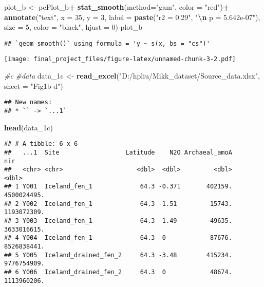 \documentclass[
]{article}
\newenvironment{Shaded}{\begin{snugshade}}{\end{snugshade}}
\newcommand{\AttributeTok}[1]{\textcolor[rgb]{0.13,0.29,0.53}{#1}}
\newcommand{\CommentTok}[1]{\textcolor[rgb]{0.56,0.35,0.01}{\textit{#1}}}
\newcommand{\DecValTok}[1]{\textcolor[rgb]{0.00,0.00,0.81}{#1}}
\newcommand{\FunctionTok}[1]{\textcolor[rgb]{0.13,0.29,0.53}{\textbf{#1}}}
\newcommand{\NormalTok}[1]{#1}
\newcommand{\OtherTok}[1]{\textcolor[rgb]{0.56,0.35,0.01}{#1}}
\newcommand{\SpecialCharTok}[1]{\textcolor[rgb]{0.81,0.36,0.00}{\textbf{#1}}}
\newcommand{\StringTok}[1]{\textcolor[rgb]{0.31,0.60,0.02}{#1}}
\begin{document}
\begin{Shaded}
\begin{Highlighting}[]
\NormalTok{plot\_b }\OtherTok{\textless{}{-}}\NormalTok{ pcPlot\_b}\SpecialCharTok{+}
  \FunctionTok{stat\_smooth}\NormalTok{(}\AttributeTok{method=}\StringTok{"gam"}\NormalTok{, }\AttributeTok{color =} \StringTok{"red"}\NormalTok{)}\SpecialCharTok{+}
  \FunctionTok{annotate}\NormalTok{(}\StringTok{"text"}\NormalTok{, }
           \AttributeTok{x =} \DecValTok{35}\NormalTok{, }\AttributeTok{y =} \DecValTok{3}\NormalTok{,}
           \AttributeTok{label =} \FunctionTok{paste}\NormalTok{(}\StringTok{"r2 = 0.29"}\NormalTok{, }\StringTok{"}\SpecialCharTok{\textbackslash{}n}\StringTok{ p = 5.642e{-}07"}\NormalTok{), }
           \AttributeTok{size =} \DecValTok{5}\NormalTok{, }\AttributeTok{color =} \StringTok{"black"}\NormalTok{, }\AttributeTok{hjust =} \DecValTok{0}\NormalTok{)}
\NormalTok{plot\_b}
\end{Highlighting}
\end{Shaded}

\begin{verbatim}
## `geom_smooth()` using formula = 'y ~ s(x, bs = "cs")'
\end{verbatim}

\texttt{[image: final\_project\_files/figure-latex/unnamed-chunk-3-2.pdf]}

\begin{Shaded}
\begin{Highlighting}[]
\CommentTok{\#c}
\CommentTok{\#data}
\NormalTok{data\_1c }\OtherTok{\textless{}{-}} \FunctionTok{read\_excel}\NormalTok{(}\StringTok{"D:/hpliu/Mikk\_dataset/Source\_data.xlsx"}\NormalTok{, }\AttributeTok{sheet =} \StringTok{"Fig1b{-}d"}\NormalTok{)}
\end{Highlighting}
\end{Shaded}

\begin{verbatim}
## New names:
## * `` -> `...1`
\end{verbatim}

\begin{Shaded}
\begin{Highlighting}[]
\FunctionTok{head}\NormalTok{(data\_1c)}
\end{Highlighting}
\end{Shaded}

\begin{verbatim}
## # A tibble: 6 x 6
##   ...1  Site                  Latitude    N2O Archaeal_amoA         nir
##   <chr> <chr>                    <dbl>  <dbl>         <dbl>       <dbl>
## 1 Y001  Iceland_fen_1             64.3 -0.371       402159. 4500024495.
## 2 Y002  Iceland_fen_1             64.3 -1.51         15743. 1193072309.
## 3 Y003  Iceland_fen_1             64.3  1.49         49635. 3633016615.
## 4 Y004  Iceland_fen_1             64.3  0            87676. 8526838441.
## 5 Y005  Iceland_drained_fen_2     64.3 -3.48        415234. 9776754909.
## 6 Y006  Iceland_drained_fen_2     64.3  0            48674. 1113960206.
\end{verbatim}
\end{document}
